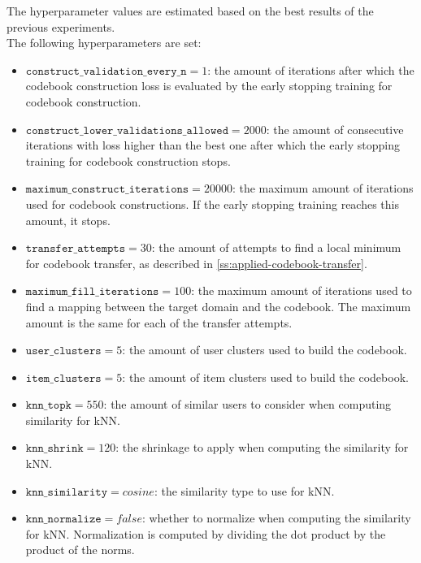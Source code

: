 The hyperparameter values are estimated based on the best results of the previous experiments.\\
The following hyperparameters are set:
\begin{itemize}
\item $\texttt{construct\_validation\_every\_n} = 1$: the amount of iterations after which the codebook construction loss is evaluated by the early stopping training for codebook construction.
\item $\texttt{construct\_lower\_validations\_allowed} = 2000$: the amount of consecutive iterations with loss higher than the best one after which the early stopping training for codebook construction stops.
\item $\texttt{maximum\_construct\_iterations} = 20000$: the maximum amount of iterations used for codebook constructions. If the early stopping training reaches this amount, it stops.
\item $\texttt{transfer\_attempts} = 30$: the amount of attempts to find a local minimum for codebook transfer, as described in \autoref{ss:applied-codebook-transfer}.
\item $\texttt{maximum\_fill\_iterations} = 100$: the maximum amount of iterations used to find a mapping between the target domain and the codebook. The maximum amount is the same for each of the transfer attempts.
\item $\texttt{user\_clusters} = 5$: the amount of user clusters used to build the codebook.
\item $\texttt{item\_clusters} = 5$: the amount of item clusters used to build the codebook.
\item $\texttt{knn\_topk} = 550$: the amount of similar users to consider when computing similarity for kNN.
\item $\texttt{knn\_shrink} = 120$: the shrinkage to apply when computing the similarity for kNN.
\item $\texttt{knn\_similarity} = cosine$: the similarity type to use for kNN.
\item $\texttt{knn\_normalize} = false$: whether to normalize when computing the similarity for kNN. Normalization is computed by dividing the dot product by the product of the norms.
\end{itemize}


